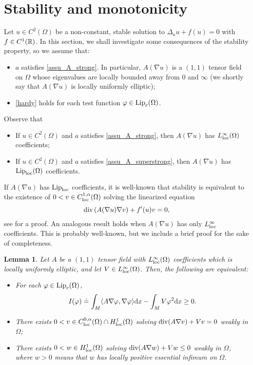 \documentclass[10 pt,a4paper]{article}
\newtheorem{lemma}[definition]{Lemma}
\theoremstyle{definition}
\begin{document}
\section{Stability and monotonicity}\label{sec_stability}

Let $u \in C^2(\Omega)$ be a non-constant, stable solution to $\Delta_a u + f(u) =0$ with $f \in C^1(\mathbb R)$. In this section, we shall investigate some consequences of the stability property, so we assume that:

\begin{itemize}
	\item $a$ satisfies \eqref{assu_A_strong}. In particular, $A(\nabla u)$ is a $(1,1)$ tensor field on $\Omega$  whose eigenvalues are locally bounded away from $0$ and $\infty$ (we shortly say that $A(\nabla u)$ is locally uniformly elliptic);
	\item \eqref{hardy} holds for each test function $\varphi \in \mathrm{Lip}_c(\Omega)$. 
\end{itemize}

Observe that 

\begin{itemize}
	\item[-] If $u \in C^2(\Omega)$ and $a$ satisfies \eqref{assu_A_strong}, then $A(\nabla u)$ has $L^\infty_{\mathrm{loc}}(\Omega)$ coefficients;
	\item[-] If $u \in C^2(\Omega)$ and $a$ satisfies \eqref{assu_A_superstrong}, then $A(\nabla u)$ has $\mathrm{Lip}_{\mathrm{loc}}(\Omega)$ coefficients.
\end{itemize} 

If $A(\nabla u)$ has $\mathrm{Lip}_{\mathrm{loc}}$ coefficients, it is well-known that stability is equivalent to the existence of $0 < v \in C^{1,\alpha}_{\mathrm{loc}}(\Omega)$ solving the linearized equation
\[
	\mathrm{div} \left(A(\nabla u) \nabla v\right) + f'(u)v = 0,
\]
see \cite{mosspie} for a proof. An analogous result holds when $A(\nabla u)$ has only $L^\infty_{\mathrm{loc}}$ coefficients. This is probably well-known, but we include a brief proof for the sake of completeness.

\begin{lemma}\label{lem_mosspie}
	Let $A$ be a $(1,1)$ tensor field with $L^\infty_{\mathrm{loc}}(\Omega)$ coefficients which is locally uniformly elliptic, and let $V \in L^\infty_{\mathrm{loc}}(\Omega)$. Then, the following are equivalent:
	\begin{itemize}
		\item[(i)] For each $\varphi \in \mathrm{Lip}_c(\Omega)$,
		\[
			I(\varphi) \doteq \int_M \langle A\nabla\varphi, \nabla \varphi\rangle \mathrm{d} x - \int_{M} V \varphi^2\mathrm{d} x \ge 0.
		\]
		\item[(ii)] There exists $0 < v \in C^{0,\alpha}_{\mathrm{loc}}(\Omega) \cap H^1_{\mathrm{loc}}(\Omega)$ solving $\mathrm{div}(A \nabla v) + Vv = 0$ weakly in $\Omega$;
		\item[(iii)] There exists $0 < w \in H^1_{\mathrm{loc}}(\Omega)$ solving $\mathrm{div}(A \nabla w) + Vw \le 0$ weakly in $\Omega$, where $w>0$ means that $w$ has locally positive essential infimum on $\Omega$.
	\end{itemize}
\end{lemma}
\end{document}
